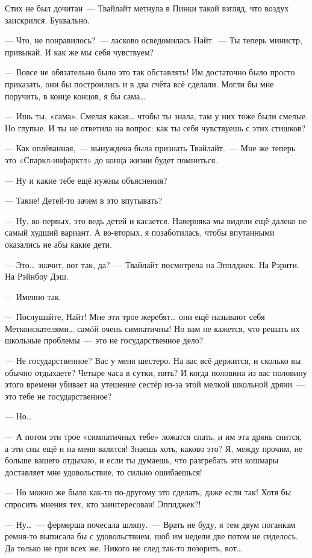 \documentclass[twoside,a5paper,12pt]{extbook}
\begin{document}
Стих не был дочитан — Твайлайт метнула в Пинки такой взгляд, что воздух заискрился. Буквально.

— Что, не понравилось? — ласково осведомилась Найт. — Ты теперь министр, привыкай. И как же мы себя чувствуем?

— Вовсе не обязательно было это так обставлять! Им достаточно было просто приказать, они бы построились и в два счёта всё сделали. Могли бы мне поручить, в конце концов, я бы сама…

— Ишь ты, «сама». Смелая какая… чтобы ты знала, там у них тоже были смелые. Но глупые. И ты не ответила на вопрос: как ты себя чувствуешь с этих стишков?

— Как оплёванная, — вынуждена была признать Твайлайт. — Мне же теперь это «Спаркл-инфарктл» до конца жизни будет помниться.

— Ну и какие тебе ещё нужны объяснения?

— Такие! Детей-то зачем в это впутывать?

— Ну, во-первых, это ведь детей и касается. Наверняка мы видели ещё далеко не самый худший вариант. А во-вторых, я позаботилась, чтобы впутанными оказались не абы какие дети.

— Это… значит, вот так, да? — Твайлайт посмотрела на Эпплджек. На Рэрити. На Рэйнбоу Дэш.

— Именно так.

— Послушайте, Найт! Мне эти трое жеребят… они ещё называют себя Меткоискателями… самóй очень симпатичны! Но вам не кажется, что решать их школьные проблемы — это не государственное дело?

— Не государственное? Вас у меня шестеро. На вас всё держится, и сколько вы обычно отдыхаете? Четыре часа в сутки, пять? И когда половина из вас половину этого времени убивает на утешение сестёр из-за этой мелкой школьной дряни — это тебе не государственное?

— Но…

— А потом эти трое «симпатичных тебе» ложатся спать, и им эта дрянь снится, а эти сны ещё и на меня валятся! Знаешь хоть, каково это? Я, между прочим, не больше вашего отдыхаю, и если ты думаешь, что разгребать эти кошмары доставляет мне удовольствие, то сильно ошибаешься!

— Но можно же было как-то по-другому это сделать, даже если так! Хотя бы спросить мнения тех, кто заинтересован! Эпплджек?!

— Ну… — фермерша почесала шляпу. — Врать не буду, я тем двум поганкам ремня-то выписала бы с удовольствием, шоб им недели две потом не сиделось. Да только не при всех же. Никого не след так-то позорить, вот…
\end{document}

